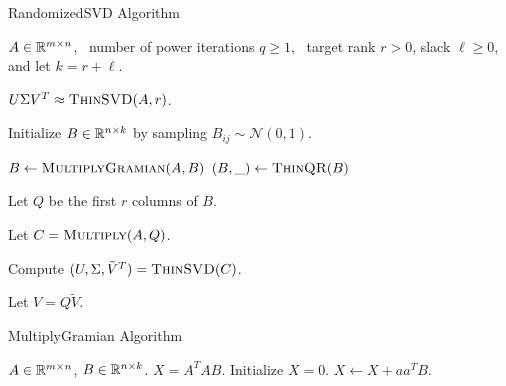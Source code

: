 \begin{algorithm}[tb]
 \caption{{\sc RandomizedSVD} Algorithm}
  \label{alg:rsvd}
  \begin{algorithmic}[1]
    \Require $A \in \mathbb{R}^{m\times n}$, \
      number of power iterations $q \ge 1$, \
      target rank $r > 0$, slack $\ell \ge 0$, and let $k=r+\ell$.

    \Ensure $U \Sigma V^T \approx \Call{ThinSVD}{A, r}$.

    \State Initialize $B \in \mathbb{R}^{n\times k}$ by sampling $B_{ij} \sim \mathcal{N}(0, 1)$.

    \For{$q$ times}
        \State $B \gets \Call{MultiplyGramian}{A, B}$
        \State $(B, \_) \gets \Call{ThinQR}{B}$
    \EndFor

    \State Let $Q$ be the first $r$ columns of $B$.

    \State Let $C = \Call{Multiply}{A, Q}$.

    \State Compute $(U, \Sigma, \tilde V^T) = \Call{ThinSVD}{C}$.

    \State Let $V = Q \tilde V$.

    \end{algorithmic}
\end{algorithm}

\begin{algorithm}[tb]
  \caption{{\sc MultiplyGramian} Algorithm}
  \label{alg:gram}
  \begin{algorithmic}[1]
    \Require $A \in \mathbb{R}^{m\times n}$, $B \in \mathbb{R}^{n\times k}$.
    \Ensure $X = A^T A B$.
    \State Initialize $X = 0$.
        \State $X \gets X + a a^T B$.
    \EndFor
  \end{algorithmic}
\end{algorithm}



